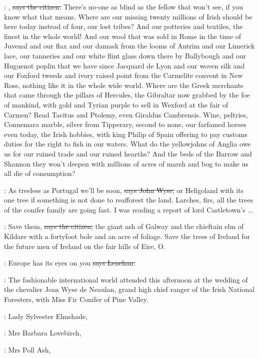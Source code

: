 \citizen:
,
\sout{says the citizen.}
There's no-one as blind as the fellow that
won't see,
if you know what that means.
Where are our missing
twenty millions of Irish should be here today instead of four,
our lost tribes?
And our potteries and textiles,
the finest in
the whole world!
And our wool that was sold in Rome in the time
of Juvenal and our flax and our damask from the looms of Antrim
and our Limerick lace,
our tanneries and our white flint glass
down there by Ballybough and our Huguenot poplin that we have since
Jacquard de Lyon and our woven silk and our Foxford tweeds and ivory
raised point from the Carmelite convent in New Ross,
nothing like it in
the whole wide world.
Where are the Greek merchants that came through the
pillars of Hercules,
the Gibraltar now grabbed by the foe of mankind,
with
gold and Tyrian purple to sell in Wexford at the fair of Carmen?
Read
Tacitus and Ptolemy,
even Giraldus Cambrensis.
Wine,
peltries,
Connemara marble,
silver from Tipperary,
second to none,
our farfamed
horses even today,
the Irish hobbies,
with king Philip of Spain offering
to pay customs duties for the right to fish in our waters.
What do the
yellowjohns of Anglia owe us for our ruined trade and our ruined hearths?
And the beds of the Barrow and Shannon they won't deepen with millions
of acres of marsh and bog to make us all die of consumption?

\johnwyse:
As treeless as Portugal we'll be soon,
\sout{says John Wyse,} or Heligoland
with its one tree if something is not done to reafforest the land.
Larches,
firs,
all the trees of the conifer family are going fast.
I was
reading a report of lord Castletown's ...

\citizen:
Save them,
\sout{says the citizen,}
the giant ash of Galway and the chieftain
elm of Kildare with a fortyfoot bole and an acre of foliage.
Save the
trees of Ireland for the future men of Ireland on the fair hills of
Eire,
O.

\lenehan:
Europe has its eyes on you
\sout{says Lenehan.}

:
The fashionable international world attended
 this afternoon
at the wedding of the chevalier Jean Wyse de Neaulan,
grand high chief
ranger of the Irish National Foresters,
with Miss Fir Conifer of Pine Valley.

:
Lady Sylvester Elmshade,

:
Mrs Barbara Lovebirch,

:
Mrs Poll Ash,

